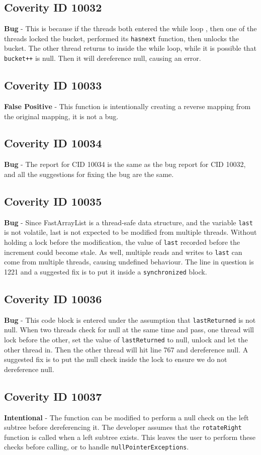 \documentclass[12pt]{article}
\begin{document}
\subsection*{Coverity ID 10032}
\textbf{Bug} - This is because if the threads both entered the while loop , then one of the threads locked the bucket, performed its \texttt{hasnext} function, then unlocks the bucket. The other thread returns to inside the while loop, while it is possible that \texttt{bucket++} is null. Then it will dereference null, causing an error.
\subsection*{Coverity ID 10033}
\textbf{False Positive} - This function is intentionally creating a reverse mapping from the original mapping, it is not a bug.
\subsection*{Coverity ID 10034}
\textbf{Bug} - The report for CID 10034 is the same as the bug report for CID 10032, and all the suggestions for fixing the bug are the same.
\subsection*{Coverity ID 10035}
\textbf{Bug} - Since FastArrayList is a thread-safe data structure, and the variable \texttt{last} is not volatile, last is not expected to be modified from multiple threads. Without holding a lock before the modification, the value of \texttt{last} recorded before the increment could become stale. As well, multiple reads and writes to \texttt{last} can come from multiple threads, causing undefined behaviour. The line in question is 1221 and a suggested fix is to put it inside a \texttt{synchronized} block.
\subsection*{Coverity ID 10036}
\textbf{Bug} - This code block is entered under the assumption that \texttt{lastReturned} is not null. When two threads check for null at the same time and pass, one thread will lock before the other, set the value of \texttt{lastReturned} to null, unlock and let the other thread in. Then the other thread will hit line 767 and dereference null. A suggested fix is to put the null check inside the lock to ensure we do not dereference null.
\subsection*{Coverity ID 10037}
\textbf{Intentional} - The function can be modified to perform a null check on the left subtree before dereferencing it. The developer assumes that the \texttt{rotateRight} function is called when a left subtree exists. This leaves the user to perform these checks before calling, or to handle \texttt{nullPointerExceptions}.
\end{document}
